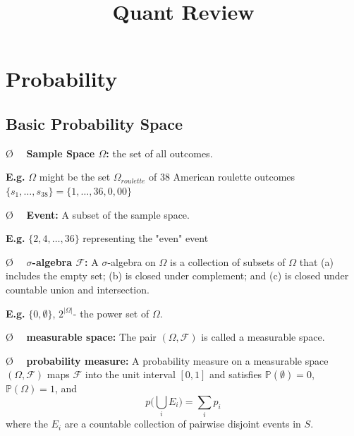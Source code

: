\documentclass[13pt]{article}
\theoremstyle{definition}
\theoremstyle{remark}
\newenvironment{point}
  {\O~~}
  {}
\newcommand{\PP}{\mathbb{P}}
\begin{document}
\begin{center}
\title{Quant Review}
    
    {}


\end{center}

\tableofcontents
\newpage

\vspace{2em}

\section{Probability}
\subsection{Basic Probability Space}
\begin{point}
    \textbf{Sample Space $\Omega$:} the set of all outcomes.

    \textbf{E.g.} $\Omega$ might be the set $\Omega_{roulette}$ of 38 American roulette outcomes $\{s_1, \dots, s_{38}\} = \{1, \dots, 36, 0, 00\}$
\end{point}  

\begin{point}
    \textbf{Event:} A subset of the sample space.
    
    \textbf{E.g.} $\{2,4,\dots,36\}$ representing the "even" event 
\end{point}

\begin{point}
    \textbf{$\sigma$-algebra $\mathcal{F}$:} A $\sigma$-algebra on $\Omega$ is a collection of subsets of $\Omega$ that (a) includes the empty set; (b) is closed under complement; and (c) is closed under countable union and intersection.
    
    \textbf{E.g.} $\{0, \emptyset\}$, $2^{|\Omega|}$- the power set of $\Omega$.
\end{point}

\begin{point}
    \textbf{measurable space:} The pair $(\Omega,\mathcal{F})$ is called a measurable space.

\end{point}

\begin{point}
    \textbf{probability measure:} A probability measure on a measurable space $(\Omega,\mathcal{F})$ maps $\mathcal{F}$ into the unit interval $[0,1]$ and satisfies $\PP(\emptyset)=0$, $\PP(\Omega)=1$, and
$$p\bigl(\bigcup_{i} E_i\bigr) = \sum_{i} p_i$$
where the $E_i$ are a countable collection of pairwise disjoint events in $S$.

\end{point}
\end{document}
